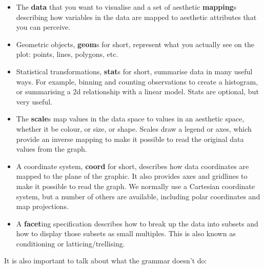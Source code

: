 \begin{itemize}
  \item The \textbf{data} that you want to visualise and a set of aesthetic \textbf{mapping}s describing how variables in the data are mapped to aesthetic attributes that you can perceive.

  \item Geometric objects, \textbf{geom}s for short, represent what you actually see on the plot: points, lines, polygons, etc.

  \item Statistical transformations, \textbf{stat}s for short, summarise data in many useful ways.  For example, binning and counting observations to create a histogram, or summarising a 2d relationship with a linear model.  Stats are optional, but very useful.

  \item The \textbf{scale}s map values in the data space to values in an aesthetic space, whether it be colour, or size, or shape.  Scales draw a legend or axes, which provide an inverse mapping to make it possible to read the original data values from the graph.

  \item A coordinate system, \textbf{coord} for short, describes how data coordinates are mapped to the plane of the graphic.  It also provides axes and gridlines to make it possible to read the graph.  We normally use a Cartesian coordinate system, but a number of others are available, including polar coordinates and map projections.

  \item A \textbf{facet}ing specification describes how to break up the data into subsets and how to display those subsets as small multiples.  This is also known as conditioning or latticing/trellising.

\end{itemize}

It is also important to talk about what the grammar doesn't do:

